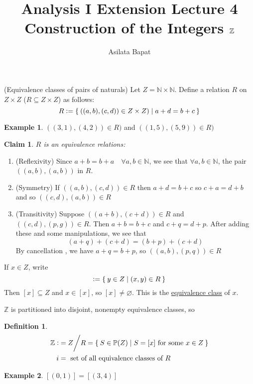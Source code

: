 \documentclass[12pt]{amsart}
\title{Analysis I Extension Lecture 4\\Construction of the Integers $\bbZ$}
\author{Asilata Bapat}
\newcommand{\bbN}{\mathbb{N}}
\newcommand{\bbZ}{\mathbb{Z}}
\newcommand{\bbP}{\mathbb{P}}
\theoremstyle{plain}
\newtheorem*{claim}{Claim}
\theoremstyle{remark}
\theoremstyle{definition}
\newtheorem*{define}{Definition}
\newtheorem*{eg}{Example}
\begin{document}
\maketitle
{}

(Equivalence classes of pairs of naturals)
\newline
Let $Z = \bbN\times \bbN$. Define a relation $R$ on $Z \times Z$ ($R \subseteq Z \times Z$) as follows:
\begin{equation*}
R \vcentcolon = \Set{ \left( (a,b),(c,d) \right) \in Z \times Z) | a+d = b+c}
\end{equation*}
\begin{eg}
$\left( (3,1),(4,2) \right) \in R)$ and $\left( (1,5),(5,9) \right) \in R)$

\end{eg}
\begin{claim}
$R$ is an equivalence relations:
\end{claim}
\begin{enumerate}[(1)]
	\item (Reflexivity) 
		Since $a+b = b+a\quad \forall a,b \in \bbN$, we see that $\forall a, b \in \bbN$, the pair $((a,b), (a,b))$ in $R$.
	\item (Symmetry)
		If $((a,b), (c,d))\in R$ then $a+d = b+c$ so $c+a = d+b$ and so $((c,d), (a,b))\in R$
	\item (Transitivity)
		Suppose $((a+b),(c+d))\in R$ and $((c,d),(p,g)) \in R$. Then $a+b = b + c $ and $c + q = d + p$. After adding these and some manipulations, we see that 
		\begin{equation*}
			(a+q) + (c+d) = (b+p) + (c+d)
		\end{equation*}
		By cancellation , we have $a+q = b+ p$, so $((a,b),(p,q)) \in R$
\end{enumerate}
If $x \in Z$, write
\begin{equation*}
	[x] \vcentcolon = \Set{ y \in Z | (x,y) \in R }
\end{equation*}
Then $[x] \subseteq Z$ and $x \in [x]$, so $[x] \neq \varnothing$. This is the \ul{equivalence class} of $x$.

\par
$\bbZ$ is partitioned into disjoint, nonempty equivalence classes, so
\begin{define}
	\begin{equation*}
	\begin{split} 
		\bbZ \vcentcolon &= Z \bigg/ R = \Set{ S \in \bbP(Z)| S = [x] \mbox{ for some } x \in Z}\\
		i	      &=  \mbox{ set of all equivalence classes of $R$}
	\end{split}
	\end{equation*}
\end{define}
\begin{eg}
	$[(0,1)] = [(3,4)]$
\end{eg}
\end{document}
